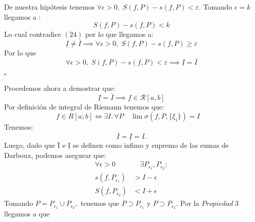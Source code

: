 \documentclass[10pt]{article}
\begin{document}
De nuestra hipótesis tenemos  $\forall \epsilon > 0,\;  S(f,P)-s(f,P) < \varepsilon$. Tomando $\epsilon=k$ llegamos a :
\begin{equation}
    S(f,P)-s(f,P) < k
\end{equation}
Lo cual contradice $(24)$ por lo que llegamos a:
\begin{equation}
\underline{I} \neq\overline{I}\implies \forall \epsilon > 0,\;  S(f,P)-s(f,P) \geq\varepsilon
\end{equation}
Por lo que 
\begin{equation}
    \forall \epsilon > 0,\;  S(f,P)-s(f,P) < \varepsilon \implies \underline{I}  =\overline{I} 
\end{equation}
\begin{flushright}
				$\square$
			\end{flushright}
Procedemos ahora a demostrar  que:
\begin{equation}
\underline{I} =\overline{I}\implies
   f \in \mathcal{R}[a, b] 
\end{equation}
Por definición de integral de Riemann tenemos que:
\begin{equation}
    f\in{R}[a; b] \iff \exists I:\forall P \quad\lim \sigma (f,P,\{\xi_i\}) = I \quad 
\end{equation}
Tenemos:
\begin{equation}
    \overline{I} = \underline{I} = I.
\end{equation}
Luego, dado que  $\overline{\mathrm{I}}$ e $\underline{\mathrm{I}}$ se definen como infimo y supremo de las sumas de Darboux, podemos asegurar que:
			\begin{align*}
				\forall \epsilon > 0  &\quad\exists P_{\epsilon_1}, P_{\epsilon_2}: \\
				s(f, P_{\epsilon_1}) &> I - \epsilon \\
				S(f, P_{\epsilon_2}) &< I + \epsilon
			\end{align*}
Tomando $P = P_{\epsilon_1}\cup P_{\epsilon_2}, $  tenemos que $P\supset P_{\epsilon_1}$ y $P\supset P_{\epsilon_2}$. Por la $Propiedad \; 3 $  llegamos a que 
\end{document}
